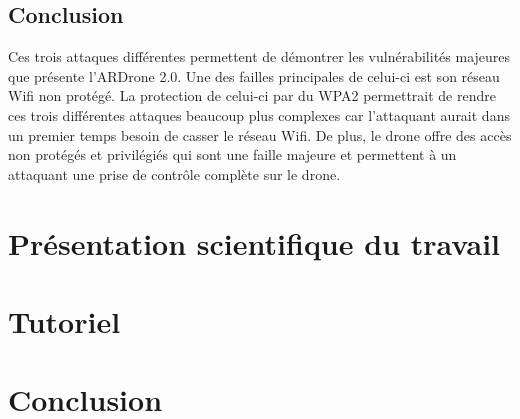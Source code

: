 \documentclass[a4paper,12pt]{report}
\begin{document}
\subsection{Conclusion}
Ces trois attaques différentes permettent de démontrer les vulnérabilités majeures que présente l'ARDrone 2.0. Une des failles principales de celui-ci est son réseau Wifi non protégé. La protection de celui-ci par du WPA2 permettrait de rendre ces trois différentes attaques beaucoup plus complexes car l'attaquant aurait dans un premier temps besoin de casser le réseau Wifi. De plus, le drone offre des accès non protégés et privilégiés qui sont une faille majeure et permettent à un attaquant une prise de contrôle complète sur le drone.




\section{Présentation scientifique du travail}

\section{Tutoriel}

\section{Conclusion}
\end{document}
